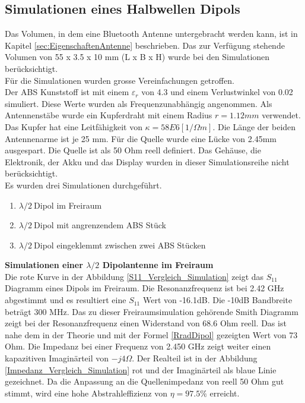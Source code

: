 \subsection{Simulationen eines Halbwellen Dipols}\label{sim_lamda2_Dipol}

Das Volumen, in dem eine Bluetooth Antenne untergebracht werden kann, ist in Kapitel \ref{sec:EigenschaftenAntenne} beschrieben. Das zur Verfügung stehende Volumen von 55 x 3.5 x 10 mm (L x B x H) wurde bei den Simulationen berücksichtigt. \\
Für die Simulationen wurden grosse Vereinfachungen getroffen.\\
Der ABS Kunststoff ist mit einem $\varepsilon_r $ von 4.3 und einem Verlustwinkel von 0.02 simuliert. Diese Werte wurden als Frequenzunabhängig angenommen. Als Antennenstäbe wurde ein  Kupferdraht mit einem Radius $r = 1.12 mm$ verwendet. Das Kupfer hat eine Leitfähigkeit von $\kappa=58E6 [1/\Omega m]$. Die Länge der beiden Antennenarme ist je 25 mm. Für die Quelle wurde eine Lücke von 2.45mm ausgespart. Die Quelle ist als 50 Ohm reell definiert. Das Gehäuse, die Elektronik, der Akku und das Display wurden in dieser Simulationsreihe nicht berücksichtigt.\\ 
Es wurden drei Simulationen durchgeführt.
\begin{enumerate}
\item  $\lambda/2 \ $Dipol im Freiraum
\item  $\lambda/2 \ $Dipol mit angrenzendem ABS Stück
\item  $\lambda/2 \ $Dipol eingeklemmt zwischen zwei ABS Stücken
\end{enumerate}

\textbf{Simulationen einer $\lambda/2$ Dipolantenne im Freiraum}\\
Die rote Kurve in der Abbildung \ref{S11_Vergleich_Simulation} zeigt das $S_{11}$ Diagramm eines Dipols im Freiraum. Die Resonanzfrequenz ist bei 2.42 GHz abgestimmt und es resultiert eine $S_{11}$ Wert von -16.1dB.  Die -10dB Bandbreite beträgt 300 MHz. Das zu dieser Freiraumsimulation gehörende Smith Diagramm zeigt bei der Resonanzfrequenz einen Widerstand von 68.6 Ohm reell. Das ist nahe dem in der Theorie und mit der Formel \ref{RradDipol} gezeigten Wert von 73 Ohm. Die Impedanz bei einer Frequenz von 2.450 GHz zeigt weiter einen kapazitiven  Imaginärteil von $-j4\Omega$. Der Realteil ist in der Abbildung \ref{Impedanz_Vergleich_Simulation} rot und der Imaginärteil als blaue Linie gezeichnet. Da die Anpassung an die Quellenimpedanz von reell 50 Ohm gut stimmt, wird eine hohe Abstrahleffizienz von $\eta = 97.5 \% $ erreicht.



